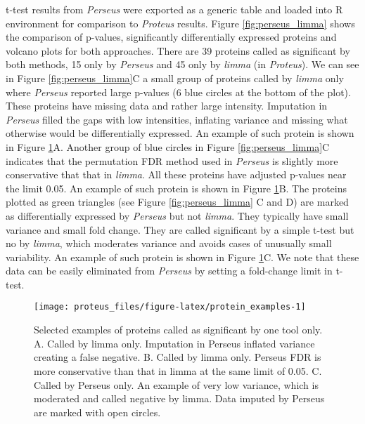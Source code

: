 \documentclass[]{article}
\begin{document}
t-test results from \emph{Perseus} were exported as a generic table and
loaded into R environment for comparison to \emph{Proteus} results.
Figure \ref{fig:perseus_limma} shows the comparison of p-values,
significantly differentially expressed proteins and volcano plots for
both approaches. There are 39 proteins called as significant by both
methods, 15 only by \emph{Perseus} and 45 only by \emph{limma} (in
\emph{Proteus}). We can see in Figure \ref{fig:perseus_limma}C a small
group of proteins called by \emph{limma} only where \emph{Perseus}
reported large p-values (6 blue circles at the bottom of the plot).
These proteins have missing data and rather large intensity. Imputation
in \emph{Perseus} filled the gaps with low intensities, inflating
variance and missing what otherwise would be differentially expressed.
An example of such protein is shown in Figure
\ref{fig:protein_examples}A. Another group of blue circles in Figure
\ref{fig:perseus_limma}C indicates that the permutation FDR method used
in \emph{Perseus} is slightly more conservative that that in
\emph{limma}. All these proteins have adjusted p-values near the limit
0.05. An example of such protein is shown in Figure
\ref{fig:protein_examples}B. The proteins plotted as green triangles
(see Figure \ref{fig:perseus_limma} C and D) are marked as
differentially expressed by \emph{Perseus} but not \emph{limma}. They
typically have small variance and small fold change. They are called
significant by a simple t-test but no by \emph{limma}, which moderates
variance and avoids cases of unusually small variability. An example of
such protein is shown in Figure \ref{fig:protein_examples}C. We note
that these data can be easily eliminated from \emph{Perseus} by setting
a fold-change limit in t-test.

\begin{figure}[H]

{\centering \texttt{[image: proteus\_files/figure-latex/protein\_examples-1]} 

}

\caption{\label{fig:protein_examples}Selected examples of proteins called as significant by one tool only. A. Called by limma only. Imputation in Perseus inflated variance creating a false negative. B. Called by limma only. Perseus FDR is more conservative than that in limma at the same limit of 0.05. C. Called by Perseus only. An example of very low variance, which is moderated and called negative by limma. Data imputed by Perseus are marked with open circles.}\label{fig:protein_examples}
\end{figure}
\end{document}
